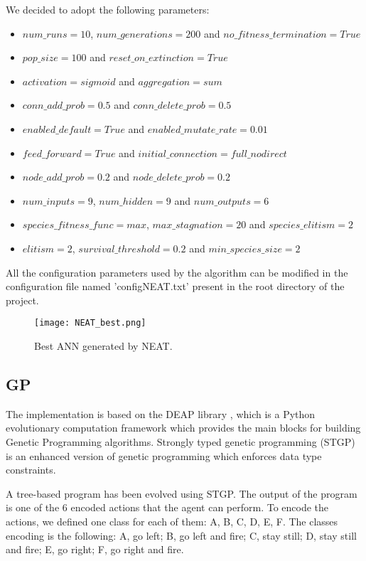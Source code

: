 We decided to adopt the following parameters:
\begin{itemize}
    \item $num\_runs = 10$, $num\_generations = 200$ and $no\_fitness\_termination = True$
    \item $pop\_size = 100$ and $reset\_on\_extinction = True$
    \item $activation = sigmoid$ and $aggregation = sum$
    \item $conn\_add\_prob = 0.5$ and $conn\_delete\_prob = 0.5$
    \item $enabled\_default = True$ and $enabled\_mutate\_rate = 0.01$
    \item $feed\_forward = True$ and $initial\_connection = full\_nodirect$
    \item $node\_add\_prob = 0.2$ and $node\_delete\_prob = 0.2$
    \item $num\_inputs = 9$, $num\_hidden = 9$ and $num\_outputs = 6$
    \item $species\_fitness\_func = max$, $max\_stagnation = 20$ and $species\_elitism = 2$
    \item $elitism = 2$, $survival\_threshold = 0.2$ and $min\_species\_size = 2$
\end{itemize}

All the configuration parameters used by the algorithm can be modified in the configuration
file named 'configNEAT.txt' present in the root directory of the project.


\begin{figure*}[htbp]
\centerline{\texttt{[image: NEAT\_best.png]}}
\caption{Best ANN generated by NEAT.}
\label{fig:NEAT_best}
\end{figure*}


\subsection{GP}
The implementation is based on the DEAP library \cite{DEAP}, which is a Python evolutionary
computation framework which provides the main blocks for building Genetic Programming
algorithms. Strongly typed genetic programming (STGP) is an enhanced version of genetic
programming which enforces data type constraints.

A tree-based program has been evolved using STGP. The output of the program is one of
the 6 encoded actions that the agent can perform. To encode the actions, we defined one
class for each of them: A, B, C, D, E, F. The classes encoding is the following:
A, go left; B, go left and fire; C, stay still; D, stay still and fire; E, go right; F, go right and fire.

